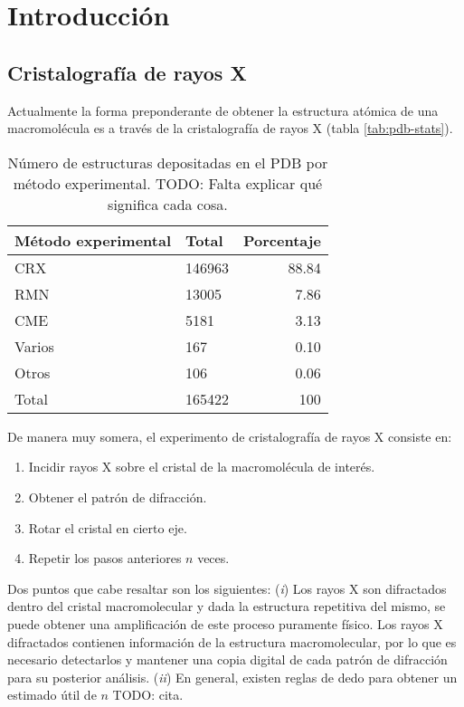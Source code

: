 \setchapterpreamble[u]{\margintoc}
\chapter{Introducción}
\section{Cristalografía de rayos X}
Actualmente la forma preponderante de obtener la estructura atómica de una macromolécula es a través de la cristalografía de rayos X (tabla \ref{tab:pdb-stats}). 

\begin{table}[h]
	\centering
	\begin{tabular}{@{}llr@{}}
		\toprule
		Método experimental & Total  & Porcentaje        \\ \midrule
		CRX     & 146963 & 88.84	\\
		RMN     & 13005  & 7.86		\\
		CME     & 5181   & 3.13		\\
		Varios  & 167    & 0.10		\\
		Otros 	& 106    & 0.06		\\
		Total   & 165422 & 100		\\ \bottomrule
	\end{tabular}%
	\caption[Número de estructuras depositadas por método experimental]{Número de estructuras depositadas en el PDB por método experimental. TODO: Falta explicar qué significa cada cosa.}
\end{table}

De manera muy somera, el experimento de cristalografía de rayos X consiste en:

\begin{enumerate}
	\item Incidir rayos X sobre el cristal de la macromolécula de interés. 
	\item Obtener el patrón de difracción. 
	\item Rotar el cristal en cierto eje. 
	\item Repetir los pasos anteriores $n$ veces.
\end{enumerate}

Dos puntos que cabe resaltar son los siguientes: (\emph{i}) Los rayos X son difractados dentro del cristal macromolecular y dada la estructura repetitiva del mismo, se puede obtener una amplificación de este proceso puramente físico. Los rayos X difractados contienen información de la estructura macromolecular, por lo que es necesario detectarlos y mantener una copia digital de cada patrón de difracción para su posterior análisis. (\emph{ii}) En general, existen reglas de dedo para obtener un estimado útil de $n$ TODO: cita. 

